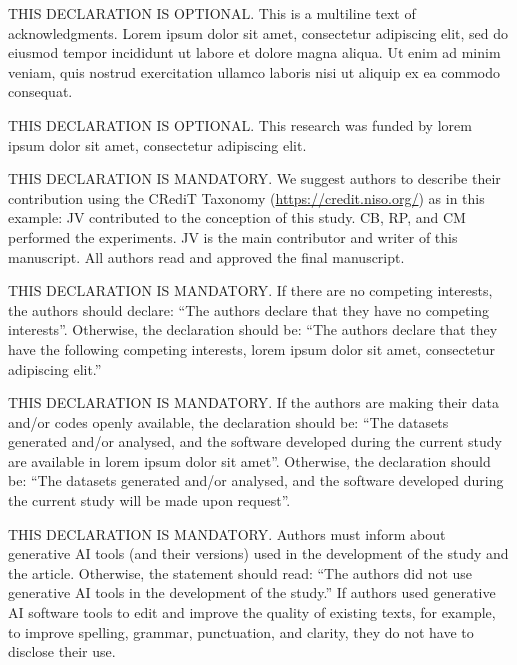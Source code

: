 \documentclass[english]{sbc2025}%
\begin{document}
\begin{declarations}

\begin{acknowledgements}
THIS DECLARATION IS OPTIONAL. This is a multiline text of acknowledgments. Lorem ipsum dolor sit amet, consectetur adipiscing elit, sed do eiusmod tempor incididunt ut labore et dolore magna aliqua. Ut enim ad minim veniam, quis nostrud exercitation ullamco laboris nisi ut aliquip ex ea commodo consequat.
\end{acknowledgements}

\begin{funding}
THIS DECLARATION IS OPTIONAL. This research was funded by lorem ipsum dolor sit amet, consectetur adipiscing elit.
\end{funding}

\begin{contributions}
THIS DECLARATION IS MANDATORY. We suggest authors to describe their contribution using the CRediT Taxonomy (\href{https://credit.niso.org/}{https://credit.niso.org/}) as in this example: JV contributed to the conception of this study. CB, RP, and CM performed the experiments. JV is the main contributor and writer of this manuscript. All authors read and approved the final manuscript. 
\end{contributions}

\begin{interests}
THIS DECLARATION IS MANDATORY. If there are no competing interests, the authors should declare: ``The authors declare that they have no competing interests''. Otherwise, the declaration should be: ``The authors declare that they have the following competing interests, lorem ipsum dolor sit amet, consectetur adipiscing elit.''
\end{interests}

\begin{materials}
THIS DECLARATION IS MANDATORY. If the authors are making their data and/or codes openly available, the declaration should be: ``The datasets generated and/or analysed, and the software developed  during the current study are available in lorem ipsum dolor sit amet''. Otherwise, the declaration should be: ``The datasets generated and/or analysed, and the software developed  during the current study will be made upon request''.
\end{materials}

\begin{aitools}
THIS DECLARATION IS MANDATORY. 
Authors must inform about generative AI tools (and their versions) used in the development of the study and the article.
Otherwise, the statement should read: ``The authors did not use generative AI tools in the development of the study.''
%
If authors used generative AI software tools to edit and improve the quality of existing texts, for example, to improve spelling, grammar, punctuation, and clarity, they do not have to disclose their use.

\end{aitools}

\end{declarations}





\end{document}
